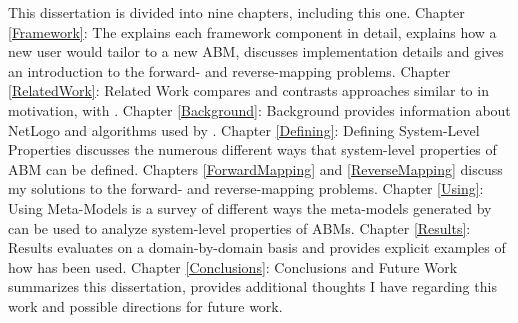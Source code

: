 This dissertation is divided into nine chapters, including this one.
Chapter \ref{Framework}: The \framework explains each framework component in detail, explains how a new user would tailor \fw to a new ABM, discusses implementation details and gives an introduction to the forward- and reverse-mapping problems.
Chapter \ref{RelatedWork}: Related Work compares and contrasts approaches similar to \fw in motivation, with \fw.
Chapter \ref{Background}: Background provides information about NetLogo and algorithms used by \fw.
Chapter \ref{Defining}: Defining System-Level Properties discusses the numerous different ways that system-level properties of ABM can be defined.
Chapters \ref{ForwardMapping} and \ref{ReverseMapping} discuss my solutions to the forward- and reverse-mapping problems.
Chapter \ref{Using}: Using Meta-Models is a survey of different ways the meta-models generated by \fw can be used to analyze system-level properties of ABMs.
Chapter \ref{Results}: Results evaluates \fw on a domain-by-domain basis and provides explicit examples of how \fw has been used.
Chapter \ref{Conclusions}: Conclusions and Future Work summarizes this dissertation, provides additional thoughts I have regarding this work and possible directions for future work.


 





